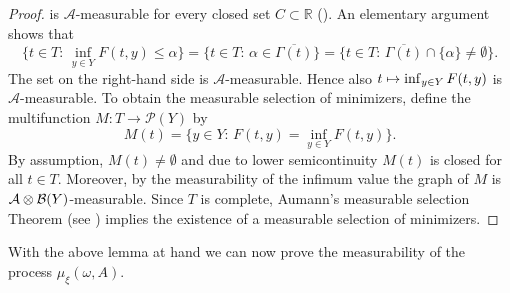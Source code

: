 \documentclass[JEP,XML,SOM,Unicode,published]{cedram}
\def\mto{\mathchoice{\longmapsto}{\mapsto}{\mapsto}{\mapsto}}
\theoremstyle{definition}
\let\w\omega
\newcommand{\R}{\mathbb{R}}
\begin{document}
\begin{proof}
is $\mathcal{A}$-measurable for every closed set $C\subset \R$ (\cf \cite[Rem.\,6.4]{FoLe}). An elementary argument shows that\vspace*{-3pt}
\begin{equation*}
\{t\in T:\, \inf_{y\in Y}F(t,y)\leq\alpha\}=\{t\in T:\,\alpha\in \overline{\Gamma(t)}\}=\{t\in T:\, \overline{\Gamma(t)}\cap \{\alpha\}\neq\emptyset\}.
\end{equation*}
The set on the right-hand side is $\mathcal{A}$-measurable. Hence also $t\mto \inf_{y\in Y}F(t,y)$ is $\mathcal{A}$-measurable. To obtain the measurable selection of minimizers, define the multifunction $M:T\to\mathcal{P}(Y)$ by\vspace*{-3pt}
\begin{equation*}
M(t)=\{y\in Y:\,F(t,y)=\inf_{y\in Y}F(t,y)\}.
\end{equation*}
By assumption, $M(t)\neq\emptyset$ and due to lower semicontinuity $M(t)$ is closed for all $t\in T$. Moreover, by the measurability of the infimum value the graph of $M$ is $\mathcal{A}\otimes\nobreak\mathcal{B}(Y)$\nobreakdash-measurable. Since $T$ is complete, Aumann's measurable selection Theorem (see \cite[Th.\,6.10]{FoLe}) implies the existence of a measurable selection of minimizers.
\end{proof}
With the above lemma at hand we can now prove the measurability of the process $\mu_{\xi}(\w,A)$.
\end{document}
